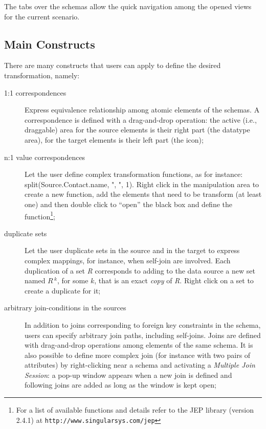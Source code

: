 \documentclass[12pt]{article}
\newcommand{\quotes}[1]{``#1''}
\newcommand{\urlstyle}[1]{{\small \tt #1}}
\newcommand{\rel}[1]{{\textit{#1}}}
\newcommand{\relclone}[2]{{\textit{#1}\,^{#2}}}
\begin{document}
The tabs over the schemas allow the quick navigation among the opened views for the current scenario.

\subsection{Main Constructs} \label{sec:constructs}

There are many constructs that users can apply to define the desired transformation, namely: 
\begin{description}
\item [1:1 correspondences] Express equivalence relationship among atomic elements of the schemas. A correspondence is defined with a drag-and-drop operation: the active (i.e., draggable) area for the source elements is their right part (the datatype area), for the target elements is their left part (the icon);  

\item [n:1 value correspondences] Let the user define complex transformation functions, as for instance: {split(Source.Contact.name, ", ", 1)}. Right click in the manipulation area to create a new function, add the elements that need to be transform (at least one) and then double click to \quotes{open} the black box and define the function\footnote{For a list of available functions and details refer to the JEP library (version 2.4.1) at \urlstyle{http://www.singularsys.com/jep}};  

\item [duplicate sets]
Let the user duplicate sets in the source and in the target to express complex mappings, for instance, when self-join are involved. Each duplication of a set \rel{R} corresponds to adding to the data source a new set named $\relclone{R}{k}$, for some $k$, that is an exact \emph{copy} of \rel{R}. Right click on a set to create a duplicate for it;
 
\item [arbitrary join-conditions in the sources] In addition to joins corresponding to foreign key constraints in the schema, users can specify arbitrary join paths, including self-joins. Joins are defined with drag-and-drop operations among elements of the same schema. It is also possible to define more complex join (for instance with two pairs of attributes) by right-clicking near a schema and activating a {\em Multiple Join Session}: a pop-up window appears when a new join is defined and following joins are added as long as the window is kept open;


\end{description}
\end{document}
